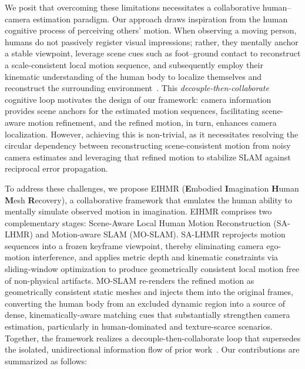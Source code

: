 \documentclass[runningheads]{llncs}
\begin{document}
We posit that overcoming these limitations necessitates a collaborative human--camera estimation paradigm. Our approach draws inspiration from the human cognitive process of perceiving others' motion. When observing a moving person, humans do not passively register visual impressions; rather, they mentally anchor a stable viewpoint, leverage scene cues such as foot--ground contact to reconstruct a scale-consistent local motion sequence, and subsequently employ their kinematic understanding of the human body to localize themselves and reconstruct the surrounding environment~\cite{shivkumar2025hierarchical,giese2003neural}. This \textit{decouple-then-collaborate} cognitive loop motivates the design of our framework: camera information provides scene anchors for the estimated motion sequences, facilitating scene-aware motion refinement, and the refined motion, in turn, enhances camera localization. However, achieving this is non-trivial, as it necessitates resolving the circular dependency between reconstructing scene-consistent motion from noisy camera estimates and leveraging that refined motion to stabilize SLAM against reciprocal error propagation.

To address these challenges, we propose EIHMR (\textbf{E}mbodied \textbf{I}magination \textbf{H}uman \textbf{M}esh \textbf{R}ecovery), a collaborative framework that emulates the human ability to mentally simulate observed motion in imagination. EIHMR comprises two complementary stages: Scene-Aware Local Human Motion Reconstruction (SA-LHMR) and Motion-aware SLAM (MO-SLAM). SA-LHMR reprojects motion sequences into a frozen keyframe viewpoint, thereby eliminating camera ego-motion interference, and applies metric depth and kinematic constraints via sliding-window optimization to produce geometrically consistent local motion free of non-physical artifacts. MO-SLAM re-renders the refined motion as geometrically consistent static meshes and injects them into the original frames, converting the human body from an excluded dynamic region into a source of dense, kinematically-aware matching cues that substantially strengthen camera estimation, particularly in human-dominated and texture-scarce scenarios. Together, the framework realizes a decouple-then-collaborate loop that supersedes the isolated, unidirectional information flow of prior work~\cite{WHAM2024,TRACE2023,GLAMR2022,GVHMR2024}. Our contributions are summarized as follows:
\end{document}
